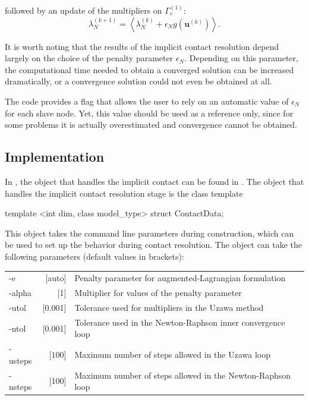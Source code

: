 followed by an update of the multipliers on $\Gamma_c ^ {\left( 1 \right) }$:
\begin{equation}
\lambda _N ^ {\left( k+1 \right) } = \left< \lambda_N ^ {\left( k \right) } + \epsilon_N g ( \boldsymbol u ^ {\left( k \right) } ) \right>.
\end{equation}


It is worth noting that the results of the implicit contact resolution depend largely on the choice of the penalty parameter $ \epsilon_N $. Depending on this parameter, the computational time needed to obtain a converged solution can be increased dramatically, or a convergence solution could not even be obtained at all.

The code provides a flag that allows the user to rely on an automatic value of $ \epsilon_N $ for each slave node. Yet, this value should be used as a reference only, since for some problems it is actually overestimated and convergence cannot be obtained.


\subsection{Implementation}

In \akantu, the object that handles the implicit contact can be found in .
The object that handles the implicit contact resolution stage is the class template
\begin{cpp}
template <int dim, class model_type> struct ContactData;
\end{cpp}
This object takes the command line parameters during construction, which can be used to set up the behavior during contact resolution. The object can take the following parameters (default values in brackets):

\begin{tabular}{lrl}
  -e & [auto] & Penalty parameter for augmented-Lagrangian formulation \\
  -alpha & [1] & Multiplier for values of the penalty parameter\\
 -utol & [0.001] & Tolerance used for multipliers in the Uzawa method\\
 -ntol &[0.001]& Tolerance used in the Newton-Raphson inner convergence loop\\
 -usteps &[100]&  Maximum number of steps allowed in the Uzawa loop\\
 -nsteps & [100]&  Maximum number of steps allowed in the Newton-Raphson loop\\
\end{tabular} \\


